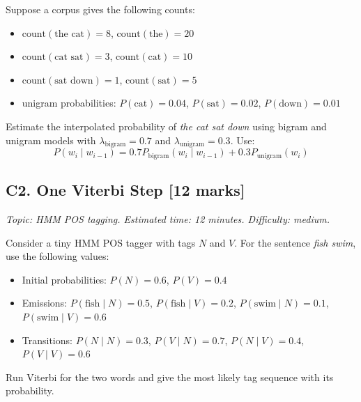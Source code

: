 \documentclass[11pt,a4paper]{article}
\newcommand{\qmarks}[1]{\hfill\textbf{[#1 marks]}}
\newcommand{\questionmeta}[3]{\textit{Topic: #1. Estimated time: #2. Difficulty: #3.}}
\begin{document}
Suppose a corpus gives the following counts:
\begin{itemize}
\item \(\mathrm{count}(\text{the cat}) = 8\), \(\mathrm{count}(\text{the}) = 20\)
\item \(\mathrm{count}(\text{cat sat}) = 3\), \(\mathrm{count}(\text{cat}) = 10\)
\item \(\mathrm{count}(\text{sat down}) = 1\), \(\mathrm{count}(\text{sat}) = 5\)
\item unigram probabilities: \(P(\text{cat})=0.04\), \(P(\text{sat})=0.02\), \(P(\text{down})=0.01\)
\end{itemize}

Estimate the interpolated probability of \textit{the cat sat down} using bigram and unigram models with \(\lambda_{\text{bigram}} = 0.7\) and \(\lambda_{\text{unigram}} = 0.3\). Use:
\[
P(w_i \mid w_{i-1}) = 0.7P_{\text{bigram}}(w_i \mid w_{i-1}) + 0.3P_{\text{unigram}}(w_i)
\]

\subsection*{C2. One Viterbi Step \qmarks{12}}
\questionmeta{HMM POS tagging}{12 minutes}{medium}

Consider a tiny HMM POS tagger with tags \(N\) and \(V\). For the sentence \textit{fish swim}, use the following values:
\begin{itemize}
\item Initial probabilities: \(P(N)=0.6\), \(P(V)=0.4\)
\item Emissions: \(P(\text{fish}\mid N)=0.5\), \(P(\text{fish}\mid V)=0.2\), \(P(\text{swim}\mid N)=0.1\), \(P(\text{swim}\mid V)=0.6\)
\item Transitions: \(P(N\mid N)=0.3\), \(P(V\mid N)=0.7\), \(P(N\mid V)=0.4\), \(P(V\mid V)=0.6\)
\end{itemize}

Run Viterbi for the two words and give the most likely tag sequence with its probability.

\clearpage
\end{document}
